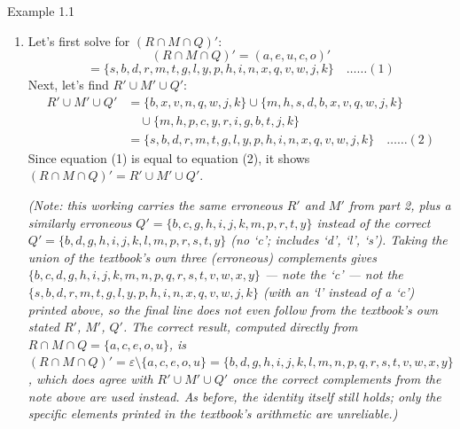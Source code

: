 \begin{example}{Example 1.1}
\begin{enumerate}
  \item Let's first solve for $(R \cap M \cap Q)'$:
  \[
    (R \cap M \cap Q)' = (a, e, u, c, o)'
  \]
  \[
    = \{s, b, d, r, m, t, g, l, y, p, h, i, n, x, q, v, w, j, k\} \quad \ldots\ldots (1)
  \]
  Next, let's find $R' \cup M' \cup Q'$:
  \begin{align*}
    R' \cup M' \cup Q' &= \{b, x, v, n, q, w, j, k\} \cup \{m, h, s, d, b, x, v, q, w, j, k\} \\
    &\quad \cup \{m, h, p, c, y, r, i, g, b, t, j, k\} \\
    &= \{s, b, d, r, m, t, g, l, y, p, h, i, n, x, q, v, w, j, k\} \quad \ldots\ldots (2)
  \end{align*}
  Since equation (1) is equal to equation (2), it shows $(R \cap M \cap Q)' = R' \cup M' \cup Q'$.

  \textit{(Note: this working carries the same erroneous $R'$ and $M'$ from
  part 2, plus a similarly erroneous
  $Q' = \{b,c,g,h,i,j,k,m,p,r,t,y\}$ instead of the correct
  $Q' = \{b,d,g,h,i,j,k,l,m,p,r,s,t,y\}$ \emph{(no `c'; includes `d', `l', `s')}.
  Taking the union of the textbook's own three (erroneous) complements gives
  $\{b,c,d,g,h,i,j,k,m,n,p,q,r,s,t,v,w,x,y\}$ --- note the `c' --- not the
  $\{s,b,d,r,m,t,g,l,y,p,h,i,n,x,q,v,w,j,k\}$ (with an `l' instead of a `c')
  printed above, so the final line does not even follow from the textbook's
  own stated $R'$, $M'$, $Q'$. The correct result, computed directly from
  $R\cap M\cap Q=\{a,c,e,o,u\}$, is
  $(R\cap M\cap Q)' = \varepsilon\setminus\{a,c,e,o,u\}
  = \{b,d,g,h,i,j,k,l,m,n,p,q,r,s,t,v,w,x,y\}$, which does agree with
  $R'\cup M'\cup Q'$ once the correct complements from the note above are
  used instead. As before, the identity itself still holds; only the
  specific elements printed in the textbook's arithmetic are unreliable.)}
\end{enumerate}
\end{example}
